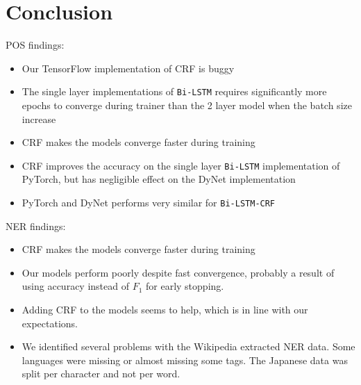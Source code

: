 

\section{Conclusion}

POS findings:

\begin{itemize}
    \item Our TensorFlow implementation of CRF is buggy
    \item The single layer implementations of \texttt{Bi-LSTM} requires
        significantly more epochs to converge during trainer than the 2 layer
        model when the batch size increase
    \item CRF makes the models converge faster during training
    \item CRF improves the accuracy on the single layer \texttt{Bi-LSTM}
        implementation of PyTorch, but has negligible effect on the DyNet
        implementation
    \item PyTorch and DyNet performs very similar for \texttt{Bi-LSTM-CRF}
\end{itemize}

NER findings:

\begin{itemize}
    \item CRF makes the models converge faster during training
    \item Our models perform poorly despite fast convergence, probably a result
      of using accuracy instead of $F_1$ for early stopping.
    \item Adding CRF to the models seems to help, which is in line with our
      expectations.
    \item We identified several problems with the Wikipedia extracted NER data.
      Some languages were missing or almost missing some tags.
      The Japanese data was split per character and not per word.
\end{itemize}

\pagebreak
